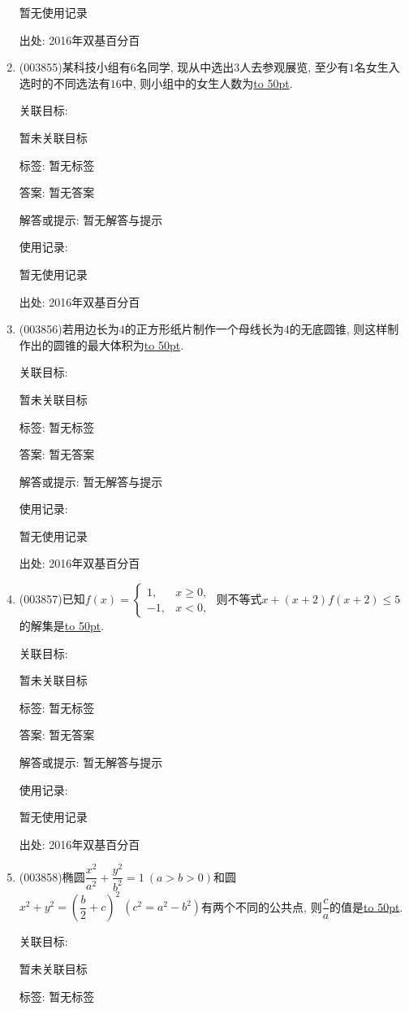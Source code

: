 \documentclass[10pt,a4paper]{article}
\newcommand{\blank}[1]{\underline{\hbox to #1pt{}}}
\begin{document}
\begin{enumerate}[1.]
暂无使用记录


出处: 2016年双基百分百
\item { (003855)}某科技小组有$6$名同学, 现从中选出$3$人去参观展览, 至少有$1$名女生入选时的不同选法有$16$中, 则小组中的女生人数为\blank{50}.


关联目标:

暂未关联目标



标签: 暂无标签

答案: 暂无答案

解答或提示: 暂无解答与提示

使用记录:

暂无使用记录


出处: 2016年双基百分百
\item { (003856)}若用边长为$4$的正方形纸片制作一个母线长为$4$的无底圆锥, 则这样制作出的圆锥的最大体积为\blank{50}.


关联目标:

暂未关联目标



标签: 暂无标签

答案: 暂无答案

解答或提示: 暂无解答与提示

使用记录:

暂无使用记录


出处: 2016年双基百分百
\item { (003857)}已知$f(x)=\begin{cases}
1, & x\ge 0,\\-1, & x<0,
\end{cases}$ 则不等式$x+(x+2)f(x+2)\le 5$的解集是\blank{50}.


关联目标:

暂未关联目标



标签: 暂无标签

答案: 暂无答案

解答或提示: 暂无解答与提示

使用记录:

暂无使用记录


出处: 2016年双基百分百
\item { (003858)}椭圆$\dfrac{x^2}{a^2}+\dfrac{y^2}{b^2}=1 \ (a>b>0)$和圆$x^2+y^2=\left(\dfrac b2+c\right)^2 \ (c^2=a^2-b^2)$有两个不同的公共点, 则$\dfrac ca$的值是\blank{50}.


关联目标:

暂未关联目标



标签: 暂无标签


\end{enumerate}
\end{document}
